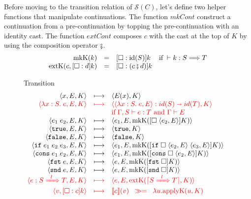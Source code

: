\documentclass[runningheads]{llncs}
\newcommand{\highlight}[1]{{\color{red} #1}}
\newcommand{\sidecond}[1]{\text{if}\;#1}
\newcommand{\figreduceto}[3]{#1 & \longmapsto & #2 & #3 \\}
\newcommand{\figreducetoH}[3]{\highlight{#1} & \highlight{\longmapsto} & 
\highlight{#2} & \highlight{#3} \\}
\newcommand{\figequalto}[3]{#1 & = & #2 & #3 \\}
\newcommand{\SMachine}[1]{\ensuremath{\mathcal{S}(#1)}}
\newcommand{\Pfunc}[2]{\ensuremath{#1 \shortrightarrow #2}}
\newcommand{\evar}[1]{#1}
\newcommand{\elam}[3]{\lambda#1:#2.\;#3}
\newcommand{\eapp}[2]{#1\;#2}
\newcommand{\etrue}[0]{\mathtt{true}}
\newcommand{\efalse}[0]{\mathtt{false}}
\newcommand{\eif}[3]{\mathtt{if}\;#1\;#2\;#3}
\newcommand{\econs}[2]{\mathtt{cons} \; #1 \; #2}
\newcommand{\efst}[1]{\mathtt{fst} \; #1}
\newcommand{\esnd}[1]{\mathtt{snd} \; #1}
\newcommand{\ecast}[2]{\ensuremath{#1 : #2}}
\newcommand{\ccast}[3]{#1 \xRightarrow[]{\enskip #2 \enskip} #3}
\newcommand{\vtrue}[0]{\mathtt{true}}
\newcommand{\vfalse}[0]{\mathtt{false}}
\newcommand{\vfunc}[4]{\langle\elam{#1}{#2}{#3},#4\rangle}
\newcommand{\sexpr}[3]{\ensuremath{\langle#1,#2,#3\rangle}}
\newcommand{\scont}[2]{\ensuremath{\langle#1,#2\rangle}}
\newcommand{\Kcons}[2]{[#1]#2}
\newcommand{\closure}[2]{\langle#1,#2\rangle}
\newcommand{\FappXO}[2]{\eapp{\square}{\closure{#1}{#2}}}
\newcommand{\Fif}[3]{\eif{\square}{\closure{#1}{#3}}{\closure{#2}{#3}}}
\newcommand{\FconsXO}[2]{\econs{\square}{\closure{#1}{#2}}}
\newcommand{\Ffst}[0]{\efst{\square}}
\newcommand{\Fsnd}[0]{\esnd{\square}}
\newcommand{\Fcast}[1]{\ecast{\square}{#1}}
\newcommand{\mbind}[0]{\ensuremath{\;\gg=\;}}
\newcommand{\denote}[1]{\ensuremath{\llbracket #1 \rrbracket}}
\newcommand{\compose}[2]{\ensuremath{#1 \fatsemi #2}}
\newcommand{\translate}[1]{\ensuremath{\lceil#1\rceil}}
\newcommand{\id}[1]{\ensuremath{\mathrm{id}(#1)}}
\newcommand{\mkCont}[1]{\ensuremath{\mathrm{mkK}(#1)}}
\newcommand{\extCont}[2]{\ensuremath{\mathrm{extK}(#1,#2)}}
\newcommand{\applyCont}[2]{\ensuremath{\mathrm{applyK}(#1,#2)}}
\newcommand{\expressiontyping}[3]{\ensuremath{#1 \vdash #2 : #3}}
\newcommand{\casttyping}[3]{\ensuremath{\vdash #1 : #2 \Longrightarrow #3}}
\newcommand{\reducetoS}[3]{\ensuremath{#2 \longmapsto_{\SMachine{#1}} #3}}
\begin{document}
Before moving to the transition relation of \SMachine{C}, let's define two 
helper functions that manipulate continuations.
%
The function $\mathit{mkCont}$ construct a continuation from a pre-continuation 
by topping the pre-continuation with an identity cast. 
%
The function $\mathit{extCont}$ composes $c$ with the cast at the top of $K$ by 
using the composition operator 
$\fatsemi$.
\[
\begin{array}{rclr}
\figequalto{\mkCont{k}}{\Kcons{\Fcast{\id{S}}}{k}}{\sidecond{\casttyping{k}{S}{T}}}
\figequalto{\extCont{c}{\Kcons{\Fcast{d}}{k}}}{
	\Kcons{\Fcast{(\compose{c}{d})}}{k}
}{}
\end{array}
\]

\begin{figure}
	\fbox{\reducetoS{C}{s}{s}} Transition
	\[
	\begin{array}{rclr}
	\figreduceto{\sexpr{\evar{x}}{E}{K}}{\scont{E(x)}{K}}{}
	\figreducetoH{
		\sexpr{\elam{x}{S}{e}}{E}{K}
	}{
		\scont{\ecast{\vfunc{x}{S}{e}{E}}{\Pfunc{id(S)}{id(T)}}}{K}
	}{}
	& &
	\highlight{
	\sidecond{
		\expressiontyping{\Gamma,S}{e}{T}
		\text{ and }
		\Gamma \vdash E}
	}
	\\
	\figreduceto{\sexpr{\eapp{e_1}{e_2}}{E}{K}}{
		\sexpr{e_1}{E}{\mkCont{\Kcons{\FappXO{e_2}{E}}{K}}}
	}{}
	\figreduceto{\sexpr{\etrue}{E}{K}}{\scont{\vtrue}{K}}{}
	\figreduceto{\sexpr{\efalse}{E}{K}}{\scont{\vfalse}{K}}{}
	\figreduceto{\sexpr{\eif{e_1}{e_2}{e_3}}{E}{K}}{
		\sexpr{e_1}{E}{\mkCont{\Kcons{\Fif{e_2}{e_3}{E}}{K}}}
	}{}
	\figreduceto{\sexpr{\econs{e_1}{e_2}}{E}{K}}{
		\sexpr{e_1}{E}{\mkCont{\Kcons{\FconsXO{e_2}{E}}{K}}}
	}{}
	\figreduceto{\sexpr{\efst{e}}{E}{K}}{
		\sexpr{e}{E}{\mkCont{\Kcons{\Ffst}{K}}}
	}{}
	\figreduceto{\sexpr{\esnd{e}}{E}{K}}{
		\sexpr{e}{E}{\mkCont{\Kcons{\Fsnd}{K}}}
	}{}
	\figreducetoH{
		\sexpr{\ecast{e}{\ccast{S}{l}{T}}}{E}{K}
	}{
		\sexpr{e}{E}{\extCont{\translate{\ccast{S}{l}{T}}}{K}}
	}{}
	\figreducetoH{\scont{v}{\Kcons{\Fcast{c}}{k}}}{
		\denote{c}(v) \; \mbind \; \lambda u. \applyCont{u}{K}
	}{}
	\end{array}
	\]
	

\end{figure}
\end{document}
